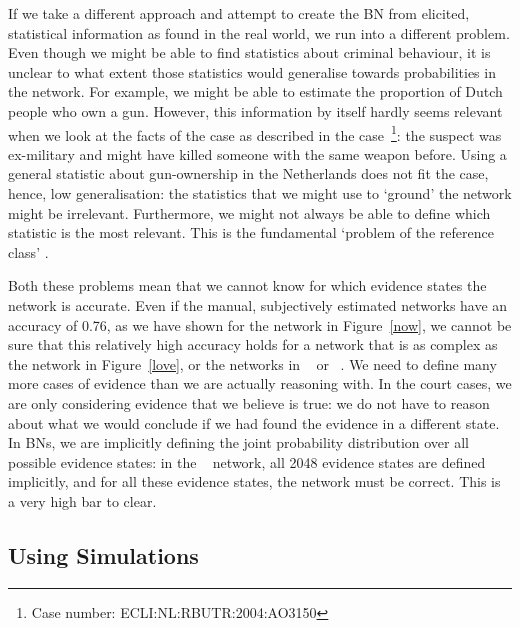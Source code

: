 \documentclass[12pt]{article}
\begin{document}
If we take a different approach and attempt to create the BN from elicited, statistical information as found in the real world, we run into a different problem. Even though we might be able to find statistics about criminal behaviour, it is unclear to what extent those statistics would generalise towards probabilities in the network. For example, we might be able to estimate the proportion of Dutch people who own a gun. However, this information by itself hardly seems relevant when we look at the facts of the case as described in the case~\footnote{Case number: ECLI:NL:RBUTR:2004:AO3150}: the suspect was ex-military and might have killed someone with the same weapon before. Using a general statistic about gun-ownership in the Netherlands does not fit the case, hence, low generalisation: the statistics that we might use to `ground' the network might be irrelevant. Furthermore, we might not always be able to define which statistic is the most relevant. This is the fundamental `problem of the reference class' \citep{colyvan2001}.

Both these problems mean that we cannot know for which evidence states the network is accurate. Even if the manual, subjectively estimated networks have an accuracy of 0.76, as we have shown for the network in Figure~\ref{now}, we cannot be sure that this relatively high accuracy holds for a network that is as complex as the network in Figure~\ref{love}, or the networks in ~\citet{vlek2016} or ~\citet{Fenton2019}.
 We need to define many more cases of evidence than we are actually reasoning with. In the court cases, we are only considering evidence that we believe is true: we do not have to reason about what we would conclude if we had found the evidence in a different state. In BNs, we are implicitly defining the joint probability distribution over all possible evidence states: in the ~\citep{vanLeeuwen2019} network, all 2048 evidence states are defined implicitly, and for all these evidence states, the network must be correct. This is a very high bar to clear.


                                                                                                                                                                      
\subsection{Using Simulations}
\end{document}
